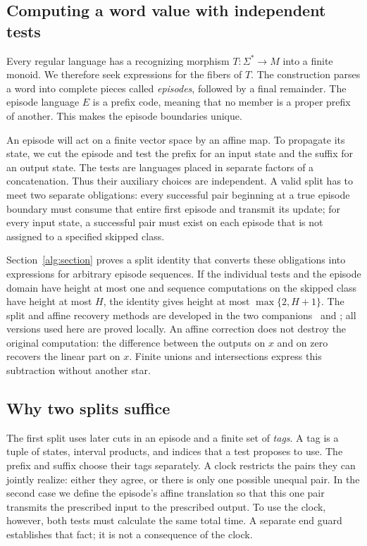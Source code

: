\subsection{Computing a word value with independent tests}

Every regular language has a recognizing morphism
$T:\Sigma^*\to M$ into a finite monoid. We therefore seek expressions
for the fibers of $T$. The construction parses a word into complete pieces called
\emph{episodes}, followed by a final remainder. The episode language $E$
is a prefix code, meaning that no member is a proper prefix of another.
This makes the episode boundaries unique.

An episode will act on a finite vector space by an affine map. To
propagate its state, we cut the episode and test the prefix for an input
state and the suffix for an output state. The tests are languages placed
in separate factors of a concatenation. Thus their auxiliary choices
are independent. A valid split has to meet two separate obligations:
every successful pair beginning at a true episode boundary must consume
that entire first episode and transmit its update; for every input state,
a successful pair must exist on each episode that is not assigned to a
specified skipped class.

Section~\ref{alg:section} proves a split identity that converts these
obligations into expressions for arbitrary episode sequences. If the
individual tests and the episode domain have height at most one and
sequence computations on the skipped class have height at most $H$, the
identity gives height at most $\max\{2,H+1\}$. The split and affine
recovery methods are developed in the two
companions~\cite[Lemmas~2.2--2.3]{HeightThirteen} and
\cite[Lemmas~2.1--2.2]{HeightFour}; all versions used here are proved
locally. An affine correction does not destroy the
original computation: the difference between the outputs on $x$ and on
zero recovers the linear part on $x$. Finite unions and intersections
express this subtraction without another star.

\subsection{Why two splits suffice}

The first split uses later cuts in an episode and a finite set of
\emph{tags}. A tag is a tuple of states, interval products, and indices
that a test proposes to use. The prefix and suffix choose their tags
separately. A clock restricts the pairs they can jointly realize: either
they agree, or there is only one possible unequal pair. In the second
case we define the episode's affine translation so that this one pair
transmits the prescribed input to the prescribed output. To use the
clock, however, both tests must calculate the same total time. A separate
end guard establishes that fact; it is not a consequence of the clock.

